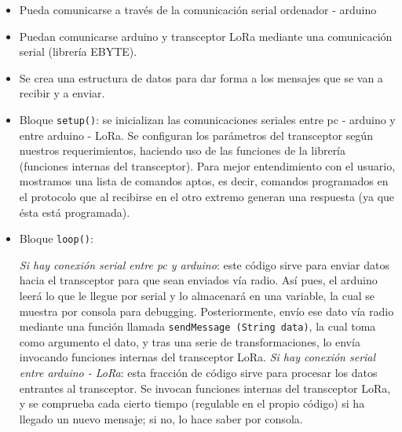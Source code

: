 \documentclass[12pt]{article}
\begin{document}
	\begin{itemize}
		\item Pueda comunicarse a través de la comunicación serial ordenador - arduino
		\item Puedan comunicarse arduino y transceptor LoRa mediante una comunicación serial (librería EBYTE). 
		\item Se crea una estructura de datos para dar forma a los mensajes que se van a recibir y a enviar.
		\item Bloque \texttt{setup()}: se inicializan las comunicaciones seriales entre pc - arduino y entre arduino - LoRa. Se configuran los parámetros del transceptor según nuestros requerimientos, haciendo uso de las funciones de la librería (funciones internas del transceptor). Para mejor entendimiento con el usuario, mostramos una lista de comandos aptos, es decir, comandos programados en el protocolo que al recibirse en el otro extremo generan una respuesta (ya que ésta está programada).

		\item Bloque \texttt{loop()}:
			\begin{outline}
			\1 \textit{Si hay conexión serial entre pc y arduino}: este código sirve para enviar datos hacia el transceptor para que sean enviados vía radio. Así pues, el arduino leerá lo que le llegue por serial  y lo almacenará en una variable, la cual se muestra por consola para debugging. Posteriormente, envío ese dato vía radio mediante una función llamada \texttt{sendMessage (String data)}, la cual toma como argumento el dato, y tras una serie de transformaciones, lo envía invocando funciones internas del transceptor LoRa.
			\1 \textit{Si hay conexión serial entre arduino - LoRa}: esta fracción de código sirve para procesar los datos entrantes al transceptor. Se invocan funciones internas del transceptor LoRa, y se comprueba cada cierto tiempo (regulable en el propio código) si ha llegado un nuevo mensaje; si no, lo hace saber por consola.
			\end{outline}
	\end{itemize}
	
	
\end{document}
